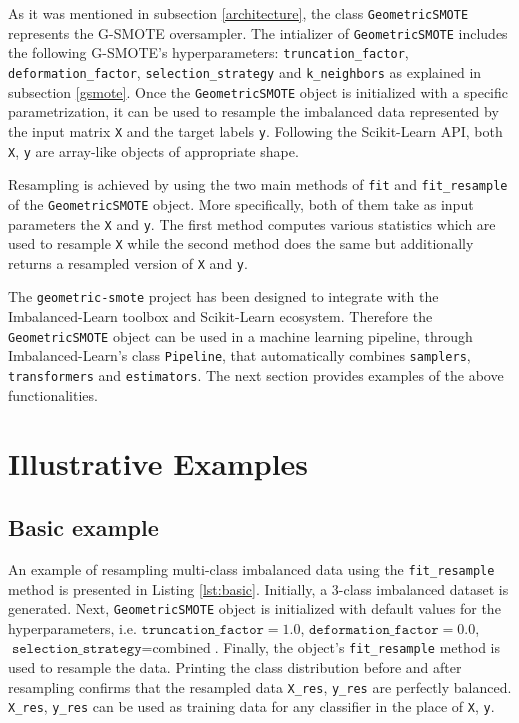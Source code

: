 \documentclass[preprint,12pt, a4paper]{elsarticle}
\begin{document}
As it was mentioned in subsection \ref{architecture}, the class \texttt{GeometricSMOTE} represents the G-SMOTE oversampler. The intializer of \texttt{GeometricSMOTE} includes the following G-SMOTE's hyperparameters: \texttt{truncation\_factor}, \texttt{deformation\_factor}, \texttt{selection\_strategy} and \texttt{k\_neighbors} as explained in subsection \ref{gsmote}. Once the \texttt{GeometricSMOTE} object is initialized with a specific parametrization, it can be used to resample the imbalanced data represented by the input matrix \texttt{X} and the target labels \texttt{y}. Following the Scikit-Learn API, both \texttt{X}, \texttt{y} are array-like objects of appropriate shape.

Resampling is achieved by using the two main methods of \texttt{fit} and \texttt{fit\_resample} of the \texttt{GeometricSMOTE} object. More specifically, both of them take as input parameters the \texttt{X} and \texttt{y}. The first method computes various statistics which are used to resample \texttt{X} while the second method does the same but additionally returns a resampled version of \texttt{X} and \texttt{y}.

The \texttt{geometric-smote} project has been designed to integrate with the Imbalanced-Learn toolbox and Scikit-Learn ecosystem. Therefore the \texttt{GeometricSMOTE} object can be used in a machine learning pipeline, through Imbalanced-Learn's class \texttt{Pipeline}, that automatically combines \texttt{samplers}, \texttt{transformers} and \texttt{estimators}. The next section provides examples of the above functionalities.

\section{Illustrative Examples}

\subsection{Basic example}

An example of resampling multi-class imbalanced data using the \texttt{fit\_resample} method is presented in Listing \ref{lst:basic}. Initially, 
a 3-class imbalanced dataset is generated. Next, \texttt{GeometricSMOTE} object is initialized with default values for the hyperparameters, i.e. $\texttt{truncation\_factor} = 1.0$, $\texttt{deformation\_factor}=0.0$, $\texttt{selection\_strategy}=\textrm{combined}$. Finally, the object's \texttt{fit\_resample} method is used to resample the data. Printing the class distribution before and after resampling confirms that the resampled data \texttt{X\_res}, \texttt{y\_res} are perfectly balanced. \texttt{X\_res}, \texttt{y\_res} can be used as training data for any classifier in the place of \texttt{X}, \texttt{y}.
\end{document}

